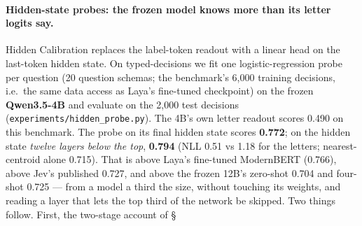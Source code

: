 \documentclass[11pt,a4paper]{article}
\newcommand{\code}[1]{\texttt{#1}}
\begin{document}
\paragraph{Hidden-state probes: the frozen model knows more than its letter logits say.} Hidden Calibration \cite{hc} replaces the label-token readout with a linear head on the last-token hidden state. On typed-decisions we fit one logistic-regression probe per question (20 question schemas; the benchmark's 6,000 training decisions, i.e.\ the same data access as Laya's fine-tuned checkpoint) on the frozen \textbf{Qwen3.5-4B} and evaluate on the 2,000 test decisions (\code{experiments/hidden\_probe.py}). The 4B's own letter readout scores 0.490 on this benchmark. The probe on its final hidden state scores \textbf{0.772}; on the hidden state \emph{twelve layers below the top}, \textbf{0.794} (NLL 0.51 vs 1.18 for the letters; nearest-centroid alone 0.715). That is above Laya's fine-tuned ModernBERT (0.766), above Jev's published 0.727, and above the frozen 12B's zero-shot 0.704 and four-shot 0.725 --- from a model a third the size, without touching its weights, and reading a layer that lets the top third of the network be skipped. Two things follow. First, the two-stage account of \S
\end{document}
